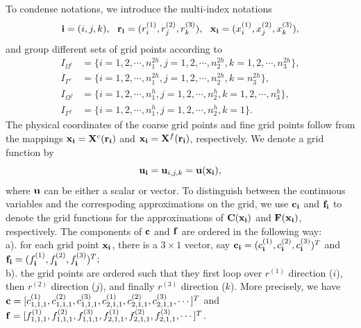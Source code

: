  To condense notations, we introduce the multi-index notations
\[{\bf i} = (i,j,k),\ \ {\bf r}_{\bf i} = (r^{(1)}_i,r^{(2)}_j,r^{(3)}_k),\ \ {\bf x}_{\bf i} = (x^{(1)}_i,x^{(2)}_j,x^{(3)}_k),\]
and group different sets of grid points according to
\begin{equation*}
\begin{aligned}
	I_{\Omega^c} &= \{i = 1,2,\cdots,n_1^{2h}, j = 1,2,\cdots,n_2^{2h}, k = 1,2,\cdots,n_3^{2h}\},\\
	I_{\Gamma^c} & = \{i = 1,2,\cdots,n_1^{2h}, j = 1,2,\cdots,n_2^{2h}, k = n_3^{2h}\},\\
	I_{\Omega^f} &= \{i = 1,2,\cdots,n_1^h, j = 1,2,\cdots,n_2^h, k = 1,2,\cdots,n_3^h\},\\
	I_{\Gamma^f} & = \{i = 1,2,\cdots,n_1^{h}, j = 1,2,\cdots,n_2^{h}, k = 1\}.
\end{aligned}	
\end{equation*}
The physical coordinates of the coarse grid points and fine grid points follow from the mappings ${\bf x}_{\bf i} = {\bf X}^c({\bf r}_{\bf i})$ and ${\bf x}_{\bf i} = {\bf X}^f({\bf r}_{\bf i})$, respectively. We denote a grid function by
\[{\bf u}_{\bf i} = {\bf u}_{i,j,k} = {\bf u}({\bf x}_{\bf i}),\]
where ${\bf u}$ can be either a scalar or vector. To distinguish between the continuous variables and the correspoding approximations on the grid, we use ${\bf c}_{\bf i}$ and ${\bf f}_{\bf i}$ to denote the grid functions for the approximations of ${\bf C}({\bf x}_{\bf i})$ and ${\bf F}({\bf x}_{\bf i})$, respectively. The components of $\bf c$ and $\bf f$ are ordered in the following way:\\
		a). for each grid point ${\bf x}_{\bf i}$, there is a $3\times 1$ vector, say ${\bf c}_{\bf i} = (c^{(1)}_{\bf i}, c^{(2)}_{\bf i}, c^{(3)}_{\bf i})^T$ and ${\bf f}_{\bf i} = (f^{(1)}_{\bf i}, f^{(2)}_{\bf i}, f^{(3)}_{\bf i})^T$;\\
		b). the grid points are ordered such that they first loop over $r^{(1)}$ direction ($i$), then $r^{(2)}$ direction ($j$), and finally $r^{(3)}$ direction ($k$). More precisely, we have  
		${\bf c} = [c^{(1)}_{1,1,1}, c^{(2)}_{1,1,1}, c^{(3)}_{1,1,1},c^{(1)}_{2,1,1}, c^{(2)}_{2,1,1}, c^{(3)}_{2,1,1},\cdots]^T$ and ${\bf f} = [f^{(1)}_{1,1,1}, f^{(2)}_{1,1,1}, f^{(3)}_{1,1,1},f^{(1)}_{2,1,1}, f^{(2)}_{2,1,1}, f^{(3)}_{2,1,1},\cdots]^T$.
	
